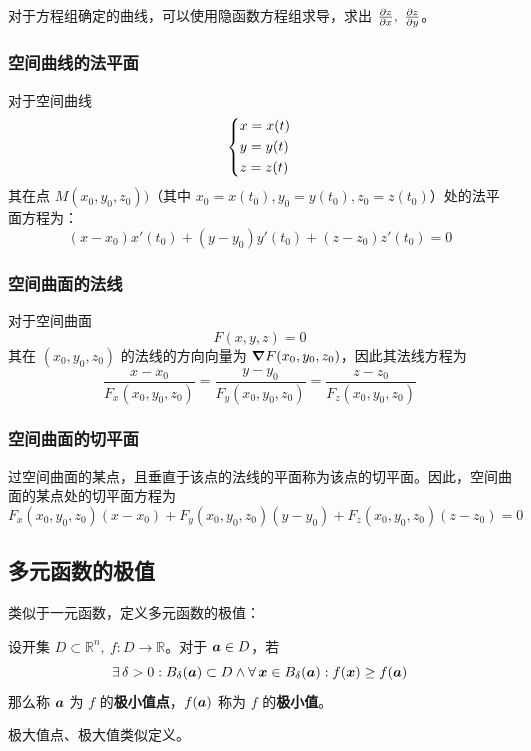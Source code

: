 对于方程组确定的曲线，可以使用隐函数方程组求导，求出 $\pdv{z}{x},\ \pdv{z}{y}$。

\subsubsection{空间曲线的法平面}

对于空间曲线
$$
\begin{dcases}
    x = x(t) \\
    y = y(t) \\
    z = z(t)
\end{dcases}
$$
其在点 $M(x_0, y_0, z_0))$（其中 $x_0 = x(t_0), y_0 = y(t_0), z_0 = z(t_0)$）处的法平面方程为：
$$
(x - x_0) x'(t_0) + (y - y_0) y'(t_0) + (z - z_0) z'(t_0) = 0
$$

\subsubsection{空间曲面的法线}

对于空间曲面
$$
F(x, y, z) = 0
$$
其在 $(x_0, y_0, z_0)$ 的法线的方向向量为 $\grad F(x_0, y_0, z_0)$，因此其法线方程为
$$
\frac{x - x_0}{F_x(x_0, y_0, z_0)} = \frac{y - y_0}{F_y(x_0, y_0, z_0)} = \frac{z - z_0}{F_z(x_0, y_0, z_0)}
$$

\subsubsection{空间曲面的切平面}

过空间曲面的某点，且垂直于该点的法线的平面称为该点的切平面。因此，空间曲面的某点处的切平面方程为
$$
F_x(x_0, y_0, z_0) (x - x_0) + F_y(x_0, y_0, z_0) (y - y_0) + F_z(x_0, y_0, z_0) (z - z_0) = 0
$$

\subsection{多元函数的极值}

类似于一元函数，定义多元函数的极值：

\begin{definition}
    设开集 $D \subset \mathbb{R}^{n},\ f: D \to \mathbb{R}$。对于 $\boldsymbol{a} \in D$，若
    $$
    \exists\,\delta > 0: B_{\delta}(\boldsymbol{a}) \subset D \land \forall\,\boldsymbol{x} \in B_{\delta}(\boldsymbol{a}): f(\boldsymbol{x}) \ge f(\boldsymbol{a})
    $$
    那么称 $\boldsymbol{a}$ 为 $f$ 的\textbf{极小值点}，$f(\boldsymbol{a})$ 称为 $f$ 的\textbf{极小值}。

    极大值点、极大值类似定义。
\end{definition}

